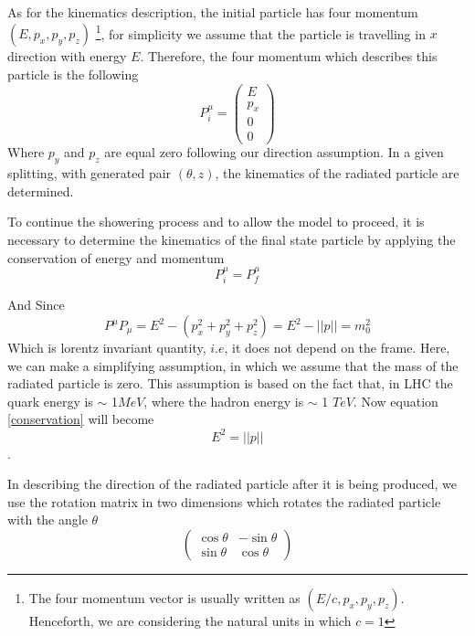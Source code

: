As for the kinematics description, the initial particle has four momentum $(E, p_{x}, p_{y},p_{z})$ \footnote{The four momentum vector is usually written as $(E/c, p_{x}, p_{y},p_{z})$. Henceforth, we are considering the natural units in which $c = 1$}, for simplicity we assume that the particle is travelling in $x$ direction with energy $E$. Therefore, the four momentum which describes this particle is the following 
\begin{equation}
P^{\mu}_{i}  = \begin{pmatrix}
E\\
p_x\\
0\\
0
\end{pmatrix}
\end{equation}
Where $p_y$ and $p_z$ are equal zero following our direction assumption. In a given splitting, with generated pair $(\theta, z)$, the kinematics of the radiated particle are determined.

To continue the showering process and to allow the model to proceed, it is necessary to determine the kinematics of the final state particle by applying the conservation of energy and momentum 
\begin{equation}
P_i^{\mu} = P_f^{\mu}
\end{equation}\label{conservation}

And Since \begin{equation}
P^{\mu} P_{\mu} = E^2 - (p_x^2 + p_y^2 + p_z^2) = E^2 - ||p|| = m_0^2
\end{equation} Which is lorentz invariant quantity, $i.e$, it does not depend on the frame. Here, we can make a simplifying assumption, in which we assume that the mass of the radiated particle is zero. This assumption is based on the fact that, in LHC the quark energy is $\sim$ 1$\si{MeV}$, where the hadron energy is $\sim$ 1 $\si{TeV}$. Now equation \ref{conservation} will become \begin{equation}\label{important}
E^2 = ||p||
\end{equation}\citep{Salam:2010zt}.    
  
In describing the direction of the radiated particle after it is being produced, we use the rotation matrix in two dimensions which rotates the radiated particle with the angle $\theta$ 
\begin{equation}
\begin{pmatrix}
\cos \theta & - \sin \theta\\
\sin \theta & \cos \theta
\end{pmatrix}
\end{equation}   


